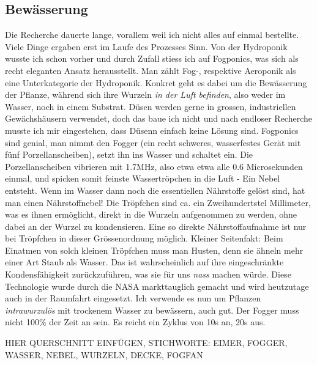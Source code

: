 \documentclass[12pt,titlepage,a4paper]{article}
\begin{document}
\subsection{Bewässerung}
Die Recherche dauerte lange, vorallem weil ich nicht alles auf einmal bestellte. Viele Dinge ergaben erst im Laufe des Prozesses Sinn. Von der Hydroponik wusste ich schon vorher und durch Zufall stiess ich auf Fogponics, was sich als recht eleganten Ansatz herausstellt. Man zählt Fog-, respektive Aeroponik als eine Unterkategorie der Hydroponik. Konkret geht es dabei um die Bewässerung der Pflanze, während sich ihre Wurzeln \textit{in der Luft befinden}, also weder im Wasser, noch in einem Substrat. Düsen werden gerne in grossen, industriellen Gewächshäusern verwendet, doch das baue ich nicht und nach endloser Recherche musste ich mir eingestehen, dass Düsenn einfach keine Lösung sind. Fogponics sind genial, man nimmt den Fogger (ein recht schweres, wasserfestes Gerät mit fünf Porzellanscheiben), setzt ihn ins Wasser und schaltet ein. Die Porzellanscheiben vibrieren mit 1.7MHz, also etwa etwa alle 0.6 Microsekunden einmal, und spicken somit feinste Wassertröpchen in die Luft - Ein Nebel entsteht. Wenn im Wasser dann noch die essentiellen Nährstoffe gelöst sind, hat man einen Nährstoffnebel! Die Tröpfchen sind ca. ein Zweihundertstel Millimeter, was es ihnen ermöglicht, direkt in die Wurzeln aufgenommen zu werden, ohne dabei an der Wurzel zu kondensieren. Eine so direkte Nährstoffaufnahme ist nur bei Tröpfchen in dieser Grössenordnung möglich. Kleiner Seitenfakt: Beim Einatmen von solch kleinen Tröpfchen muss man Husten, denn sie ähneln mehr einer Art Staub als Wasser. Das ist wahrscheinlich auf ihre eingeschränkte Kondensfähigkeit zurückzuführen, was sie für uns \textit{nass} machen würde. Diese Technologie wurde durch die NASA markttauglich gemacht und wird heutzutage auch in der Raumfahrt eingesetzt. Ich verwende es nun um Pflanzen \textit{intrawurzulös} mit trockenem Wasser zu bewässern, auch gut. \n Der Fogger muss nicht 100\% der Zeit an sein. Es reicht ein Zyklus von 10s an, 20s aus.

HIER QUERSCHNITT EINFÜGEN, STICHWORTE: EIMER, FOGGER, WASSER, NEBEL, WURZELN, DECKE, FOGFAN
\end{document}
